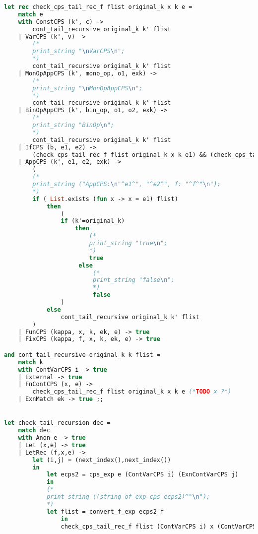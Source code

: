 \begin{lstlisting}[language=Caml, caption=Tail recursion for CPS transformed expressions]
let rec check_cps_tail_rec_f flist original_k x k e = 
    match e
    with ConstCPS (k', c) -> 
        cont_tail_recursive original_k k' flist
    | VarCPS (k', v) -> 
        (*
        print_string "\nVarCPS\n"; 
        *)
        cont_tail_recursive original_k k' flist
    | MonOpAppCPS (k', mono_op, o1, exk) ->
        (*
        print_string "\nMonOpAppCPS\n"; 
        *)
        cont_tail_recursive original_k k' flist
    | BinOpAppCPS (k', bin_op, o1, o2, exk) -> 
        (*
        print_string "BinOp\n"; 
        *)
        cont_tail_recursive original_k k' flist
    | IfCPS (b, e1, e2) -> 
        (check_cps_tail_rec_f flist original_k x k e1) && (check_cps_tail_rec_f flist original_k x k e2)
    | AppCPS (k', e1, e2, exk) -> 
        (
        (*
        print_string ("AppCPS:\n"^e1^", "^e2^", f: "^f^"\n");
        *)
        if ( List.exists (fun x -> x = e1) flist)
            then 
                (
                if (k'=original_k) 
                    then 
                        (*
                        print_string "true\n";
                        *)
                        true
                     else 
                         (*
                         print_string "false\n";
                         *)
                         false
                )
            else
                cont_tail_recursive original_k k' flist
        )
    | FunCPS (kappa, x, k, ek, e) -> true
    | FixCPS (kappa, f, x, k, ek, e) -> true

and cont_tail_recursive original_k k flist = 
    match k
    with ContVarCPS i -> true
    | External -> true
    | FnContCPS (x, e) -> 
        check_cps_tail_rec_f flist original_k x k e (*TODO x ?*)
    | ExnMatch ek -> true ;;


let check_tail_recursion dec =
    match dec
    with Anon e -> true
    | Let (x,e) -> true
    | LetRec (f,x,e) ->
        let (i,j) = (next_index(),next_index()) 
        in
            let ecps2 = cps_exp e (ContVarCPS i) (ExnContVarCPS j) 
            in
            (*
            print_string ((string_of_exp_cps ecps2)^"\n");
            *)
            let flist = convert_f_exp ecps2 f
                in
                check_cps_tail_rec_f flist (ContVarCPS i) x (ContVarCPS i) ecps2 ;;
                
\end{lstlisting}